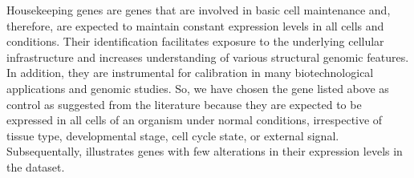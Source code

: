 \documentclass[journal]{IEEEtran}
\begin{document}
Housekeeping genes are genes that are involved in basic cell maintenance and, therefore, are expected to maintain constant expression levels in all cells and conditions. Their identification facilitates exposure to the underlying cellular infrastructure and increases understanding of various structural genomic features. In addition, they are instrumental for calibration in many biotechnological applications and genomic studies. So, we have chosen the gene listed above as control as suggested from the literature\cite{Eisenberg2013, Caracausi2017} because they are expected to be expressed in all cells of an organism under normal conditions, irrespective of tissue type, developmental stage, cell cycle state, or external signal.
Subsequentally,  illustrates genes with few alterations in their expression levels in the dataset.
\end{document}
